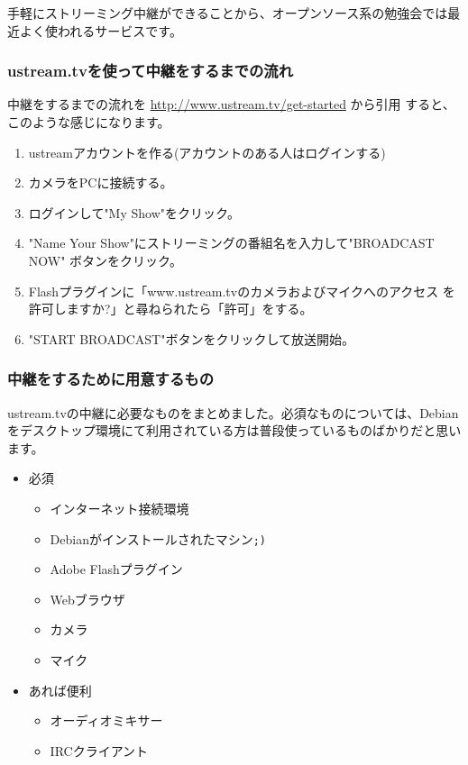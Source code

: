 \documentclass[mingoth,a4paper]{jsarticle}
\begin{document}
手軽にストリーミング中継ができることから、オープンソース系の勉強会では最
近よく使われるサービスです。

\subsubsection{ustream.tvを使って中継をするまでの流れ}

中継をするまでの流れを \url{http://www.ustream.tv/get-started} から引用
すると、このような感じになります。

\begin{enumerate}
 \item ustreamアカウントを作る(アカウントのある人はログインする)
 \item カメラをPCに接続する。
 \item ログインして"My Show"をクリック。
 \item "Name Your Show"にストリーミングの番組名を入力して"BROADCAST NOW"
       ボタンをクリック。
 \item Flashプラグインに「www.ustream.tvのカメラおよびマイクへのアクセス
       を許可しますか?」と尋ねられたら「許可」をする。
 \item "START BROADCAST"ボタンをクリックして放送開始。
\end{enumerate}

\subsubsection{中継をするために用意するもの}

ustream.tvの中継に必要なものをまとめました。必須なものについては、Debian
をデスクトップ環境にて利用されている方は普段使っているものばかりだと思い
ます。

\begin{itemize}
 \item 必須
       \begin{itemize}
	\item インターネット接続環境
	\item Debianがインストールされたマシン\verb|;)|
	\item Adobe Flashプラグイン
	\item Webブラウザ
	\item カメラ
	\item マイク
       \end{itemize}
 \item あれば便利
       \begin{itemize}
	\item オーディオミキサー
	\item IRCクライアント
       \end{itemize}
\end{itemize}
\end{document}
